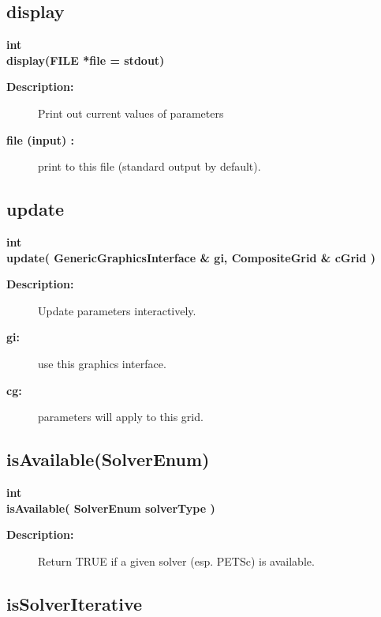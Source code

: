 \subsection{display}
 
\begin{flushleft} \textbf{%
int  \\ 
\settowidth{\OgesParametersIncludeArgIndent}{display(}%
display(FILE *file  = stdout)
}\end{flushleft}
\begin{description}
\item[{\bf Description:}] 
   Print out current values of parameters
\item[{\bf file (input) :}]  print to this file (standard output by default).
\end{description}
\subsection{update}
 
\begin{flushleft} \textbf{%
int  \\ 
\settowidth{\OgesParametersIncludeArgIndent}{update(}%
update( GenericGraphicsInterface \& gi, CompositeGrid \& cGrid )
}\end{flushleft}
\begin{description}
\item[{\bf Description:}] 
   Update parameters interactively.
\item[{\bf gi:}]  use this graphics interface.
\item[{\bf cg:}]  parameters will apply to this grid.
\end{description}
\subsection{isAvailable(SolverEnum) }
 
\begin{flushleft} \textbf{%
int  \\ 
\settowidth{\OgesParametersIncludeArgIndent}{isAvailable(}%
isAvailable( SolverEnum solverType )
}\end{flushleft}
\begin{description}
\item[{\bf Description:}] 
   Return TRUE if a given solver (esp. PETSc) is available.
\end{description}
\subsection{isSolverIterative}
 
